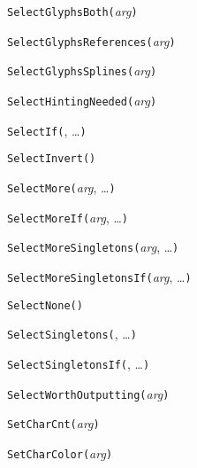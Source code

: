 \noindent\texttt{SelectGlyphsBoth(}\textit{arg}\texttt{)}


\noindent\texttt{SelectGlyphsReferences(}\textit{arg}\texttt{)}


\noindent\texttt{SelectGlyphsSplines(}\textit{arg}\texttt{)}


\noindent\texttt{SelectHintingNeeded(}\textit{arg}\texttt{)}


\noindent\texttt{SelectIf(}, \ldots\texttt{)}


\noindent\texttt{SelectInvert(}\texttt{)}


\noindent\texttt{SelectMore(}\textit{arg}, \ldots\texttt{)}


\noindent\texttt{SelectMoreIf(}\textit{arg}, \ldots\texttt{)}


\noindent\texttt{SelectMoreSingletons(}\textit{arg}, \ldots\texttt{)}


\noindent\texttt{SelectMoreSingletonsIf(}\textit{arg}, \ldots\texttt{)}


\noindent\texttt{SelectNone(}\texttt{)}


\noindent\texttt{SelectSingletons(}, \ldots\texttt{)}


\noindent\texttt{SelectSingletonsIf(}, \ldots\texttt{)}


\noindent\texttt{SelectWorthOutputting(}\textit{arg}\texttt{)}


\noindent\texttt{SetCharCnt(}\textit{arg}\texttt{)}


\noindent\texttt{SetCharColor(}\textit{arg}\texttt{)}

